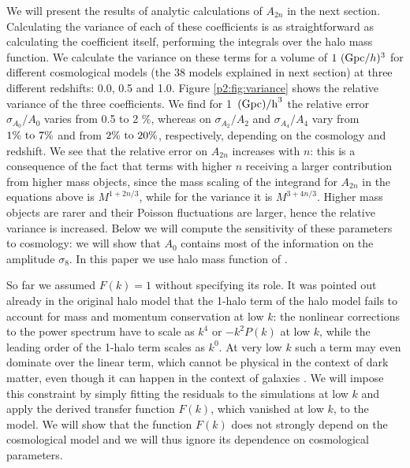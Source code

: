 \documentclass[
  11pt,
  twoside,
  openright,
  titlepage,
  headings=optiontoheadandtoc
]{scrbook}
\begin{document}
We will present the results of analytic calculations of $A_{2n}$ in the next section. 
Calculating the variance of each of these coefficients is as straightforward as calculating the coefficient itself, 
performing the integrals over the halo mass function. We calculate the variance on these terms for a volume of $1\ ({\rm 
Gpc}/h)^3$ for different cosmological models 
(the 38 models explained in next section) at three different redshifts: 0.0, 0.5 and 1.0. Figure \ref{p2:fig:variance} shows the relative variance of the three coefficients. We find 
for 1\ ${\rm (Gpc)/h}^3$ the relative error $\sigma_{A_0}/A_0$ varies from 0.5 to 2 \%,
whereas on $\sigma_{A_2}/A_2$ and $\sigma_{A_4}/A_4$  vary from $1\%\ \rm{to}\ 7\%$ and from $2\%\ \rm{to}\ 20\%$, respectively, depending on the cosmology and redshift. 
We see that the relative error on $A_{2n}$ increases with $n$: this is a consequence of the fact that terms with higher 
$n$ receiving a larger contribution from higher mass objects, since the mass scaling of the 
integrand for $A_{2n}$ in the equations above is $M^{1+2n/3}$, while for the variance it is $M^{3+4n/3}$.
Higher mass objects are rarer and their Poisson fluctuations are larger, hence the relative 
variance is increased. 
Below we will compute the sensitivity of these parameters to cosmology: we will show that $A_0$ contains 
most of the information on the amplitude $\sigma_8$. 
In this paper we use halo mass function of \cite{2008ApJ...688..709T}. 

So far we assumed $F(k)=1$ without specifying its role. 
It was pointed out already in the original halo model \citep{2000MNRAS.318..203S} 
that the 1-halo term of the halo model fails to account for mass 
and momentum conservation at low $k$: the nonlinear corrections to the power spectrum have to scale as 
$k^4$ or $-k^2P(k)$ at low $k$, while the leading order of the 1-halo term scales as $k^0$. 
At very low $k$ such a term may even dominate over the linear term, which cannot be physical in 
the context of dark matter, even though it can happen in the context of galaxies \cite{2013PhRvD..88h3507B}. 
We will impose this constraint by simply fitting the residuals to the simulations at low $k$ and apply the derived transfer 
function $F(k)$, which vanished at low $k$,
to the model. We will show that the function $F(k)$ does not strongly depend on the cosmological 
model and we will thus ignore its dependence on cosmological parameters. 

\end{document}
